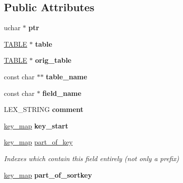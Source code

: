 \subsection*{Public Attributes}
\begin{DoxyCompactItemize}
\item 
\mbox{\label{classField_adec07854810a1429f646558b2029b208}} 
uchar $\ast$ {\bfseries ptr}
\item 
\mbox{\label{classField_a607de8ebb0032df97ba4c82109efddb1}} 
\mbox{\hyperlink{structTABLE}{T\+A\+B\+LE}} $\ast$ {\bfseries table}
\item 
\mbox{\label{classField_a16ff48edd07651cc2a9552752ac88972}} 
\mbox{\hyperlink{structTABLE}{T\+A\+B\+LE}} $\ast$ {\bfseries orig\+\_\+table}
\item 
\mbox{\label{classField_a1615a9d85dfc96d6ca6a6ceb30e4eefd}} 
const char $\ast$$\ast$ {\bfseries table\+\_\+name}
\item 
\mbox{\label{classField_a39470f4875cfb68a0f4b1a217e0c91f9}} 
const char $\ast$ {\bfseries field\+\_\+name}
\item 
\mbox{\label{classField_af98266b375e7f1ebe5b77d1cc742f024}} 
L\+E\+X\+\_\+\+S\+T\+R\+I\+NG {\bfseries comment}
\item 
\mbox{\label{classField_a0b3da9cd4bf7de35249749f0583477a6}} 
\mbox{\hyperlink{classBitmap_3_0164_01_4}{key\+\_\+map}} {\bfseries key\+\_\+start}
\item 
\mbox{\label{classField_a808faca78574fb96b2137dd273a1fc8e}} 
\mbox{\hyperlink{classBitmap_3_0164_01_4}{key\+\_\+map}} \mbox{\hyperlink{classField_a808faca78574fb96b2137dd273a1fc8e}{part\+\_\+of\+\_\+key}}
\begin{DoxyCompactList}\small\item\em Indexes which contain this field entirely (not only a prefix) \end{DoxyCompactList}\item 
\mbox{\label{classField_a0e986c23d4e4c91d7c1a52ea0f1f6fa3}} 
\mbox{\hyperlink{classBitmap_3_0164_01_4}{key\+\_\+map}} {\bfseries part\+\_\+of\+\_\+sortkey}
$$
\end{DoxyCompactItemize}
